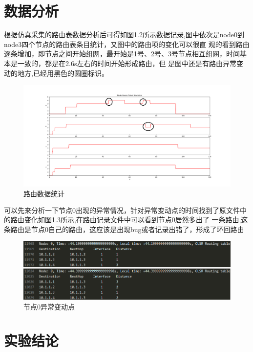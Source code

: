 \documentclass[a4paper,12pt]{report}
\begin{document}
\begin{spacing}{1.5}
\section{数据分析}
根据仿真采集的路由表数据分析后可得如图1.2所示数据记录,图中依次是node0到node3四个节点的路由表条目统计，又图中的路由项的变化可以很直
观的看到路由逐条增加，即节点之间开始组网，最开始是1号、2号、3号节点相互组网，时间基本是一致的，都是在2.6s左右的时间开始形成路由，但
是图中还是有路由异常变动的地方,已经用黑色的圆圈标识。
\begin{figure}[hbtp]
	\centering
	\includegraphics [width=1.0\textwidth]{figure//Figure_1.png}
	\caption{路由数据统计}\label{figure1}
\end{figure}

可以先来分析一下节点0出现的异常情况，针对异常变动点的时间找到了原文件中的路由变化如图1.3所示,在路由记录文件中可以看到节点0居然多出了
一条路由,这条路由是节点0自己的路由，这应该是出现bug或者记录出错了，形成了环回路由
\begin{figure}[hbtp]
	\centering
	\includegraphics [width=1.0\textwidth]{figure//0-1.png}
	\caption{节点0异常变动点}\label{node0}
\end{figure}
\section{实验结论}

\end{spacing}

\end{document}
